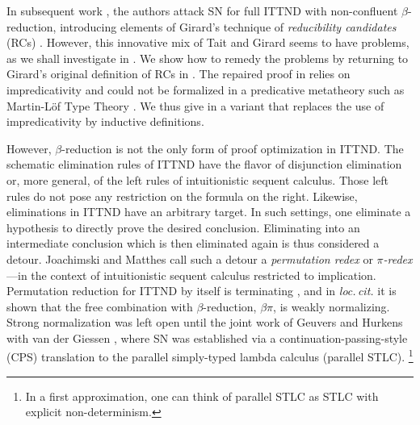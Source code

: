 \documentclass[a4paper,USenglish,cleveref, autoref, thm-restate]{lipics-v2019}
\newcommand{\loccit}{\emph{loc.\,cit.}\xspace}
\begin{document}
In subsequent work \cite{geuversHurkens:types17}, the authors attack
SN for full ITTND with non-confluent $\beta$-reduction, introducing
elements of Girard's technique of \emph{reducibility candidates} (RCs)
\cite{girard:thesis,girardLafontTaylor:proofsAndTypes}.  However, this
innovative mix of Tait and Girard seems to have problems, as we shall
investigate in .  We show how to remedy the problems by
returning to Girard's original definition of RCs in .
The repaired proof in  relies on impredicativity
and could not be formalized in a predicative metatheory such as
Martin-Löf Type Theory \cite{MartinLoef84}.  We thus give in
 a variant that
replaces the use of impredicativity by inductive definitions.

However, $\beta$-reduction is not the only form of proof optimization in ITTND.
The schematic elimination rules of ITTND have the flavor of
disjunction elimination or, more general, of the left rules of
intuitionistic sequent calculus.  Those left rules do not pose any
restriction on the formula on the right.  Likewise, eliminations in
ITTND have an arbitrary target.  In such settings, one eliminate a hypothesis to directly prove the desired conclusion.
Eliminating into an intermediate conclusion which is then eliminated
again is thus considered a detour.
Joachimski and Matthes \cite{joachimskiMatthes:rta00}
call such a detour a \emph{permutation redex} or
\emph{$\pi$-redex}\footnotemark{}
---in the context of intuitionistic sequent calculus restricted to implication.
%
Permutation reduction for ITTND by itself is terminating
\cite{geuversHurkens:types17}, and in \loccit it is shown that the
free combination with $\beta$-reduction, $\beta\pi$, is weakly
normalizing.  Strong normalization was left open until the joint work
of Geuvers and Hurkens
with van der Giessen \cite{geuversGiessenHurkens:fundinf19}, where SN
was established via a continuation-passing-style (CPS) translation to
the parallel simply-typed lambda calculus (parallel STLC).%
\footnote{In a first approximation, one can think of parallel STLC as STLC with explicit non-determinism.}
\end{document}
